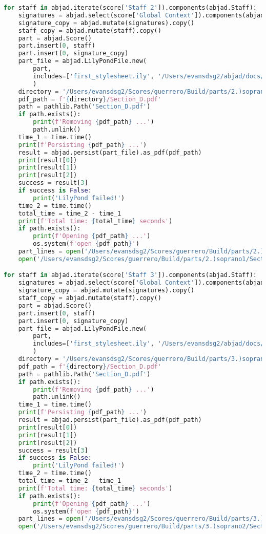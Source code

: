 \begin{lstlisting}[language=Python, caption=Invocation Source Code]
for staff in abjad.iterate(score['Staff 2']).components(abjad.Staff):
    signatures = abjad.select(score['Global Context']).components(abjad.Staff)
    signature_copy = abjad.mutate(signatures).copy()
    staff_copy = abjad.mutate(staff).copy()
    part = abjad.Score()
    part.insert(0, staff)
    part.insert(0, signature_copy)
    part_file = abjad.LilyPondFile.new(
        part,
        includes=['first_stylesheet.ily', '/Users/evansdsg2/abjad/docs/source/_stylesheets/abjad.ily'],
        )
    directory = '/Users/evansdsg2/Scores/guerrero/Build/parts/2.)soprano1'
    pdf_path = f'{directory}/Section_D.pdf'
    path = pathlib.Path('Section_D.pdf')
    if path.exists():
        print(f'Removing {pdf_path} ...')
        path.unlink()
    time_1 = time.time()
    print(f'Persisting {pdf_path} ...')
    result = abjad.persist(part_file).as_pdf(pdf_path)
    print(result[0])
    print(result[1])
    print(result[2])
    success = result[3]
    if success is False:
        print('LilyPond failed!')
    time_2 = time.time()
    total_time = time_2 - time_1
    print(f'Total time: {total_time} seconds')
    if path.exists():
        print(f'Opening {pdf_path} ...')
        os.system(f'open {pdf_path}')
    part_lines = open('/Users/evansdsg2/Scores/guerrero/Build/parts/2.)soprano1/Section_D.ly').readlines()
    open('/Users/evansdsg2/Scores/guerrero/Build/parts/2.)soprano1/Section_D.ly', 'w').writelines(part_lines[15:-1])

for staff in abjad.iterate(score['Staff 3']).components(abjad.Staff):
    signatures = abjad.select(score['Global Context']).components(abjad.Staff)
    signature_copy = abjad.mutate(signatures).copy()
    staff_copy = abjad.mutate(staff).copy()
    part = abjad.Score()
    part.insert(0, staff)
    part.insert(0, signature_copy)
    part_file = abjad.LilyPondFile.new(
        part,
        includes=['first_stylesheet.ily', '/Users/evansdsg2/abjad/docs/source/_stylesheets/abjad.ily'],
        )
    directory = '/Users/evansdsg2/Scores/guerrero/Build/parts/3.)soprano2'
    pdf_path = f'{directory}/Section_D.pdf'
    path = pathlib.Path('Section_D.pdf')
    if path.exists():
        print(f'Removing {pdf_path} ...')
        path.unlink()
    time_1 = time.time()
    print(f'Persisting {pdf_path} ...')
    result = abjad.persist(part_file).as_pdf(pdf_path)
    print(result[0])
    print(result[1])
    print(result[2])
    success = result[3]
    if success is False:
        print('LilyPond failed!')
    time_2 = time.time()
    total_time = time_2 - time_1
    print(f'Total time: {total_time} seconds')
    if path.exists():
        print(f'Opening {pdf_path} ...')
        os.system(f'open {pdf_path}')
    part_lines = open('/Users/evansdsg2/Scores/guerrero/Build/parts/3.)soprano2/Section_D.ly').readlines()
    open('/Users/evansdsg2/Scores/guerrero/Build/parts/3.)soprano2/Section_D.ly', 'w').writelines(part_lines[15:-1])


\end{lstlisting}
